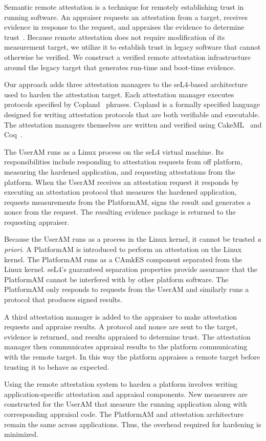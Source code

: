 Semantic remote attestation is a technique for remotely establishing
trust in running software.  An appraiser requests an attestation from
a target, receives evidence in response to the request, and appraises
the evidence to determine
trust~\cite{Haldar:04:Semantic-Remote,Coker::Principles-of-R}. Because
remote attestation does not require modification of its measurement
target, we utilize it to establish trust in legacy software
that cannot otherwise be verified.  We construct a verified remote
attestation infrastructure around the legacy target that generates
run-time and boot-time evidence.

Our approach adds three attestation managers to the seL4-based
architecture used to harden the attestation target.  Each attestation
manager executes protocols specified by Copland~\cite{Ramsdell:2019aa}
phrases.  Copland is a formally specified language designed for
writing attestation protocols that are both verifiable and executable.
The attestation managers themselves are written and verified using
CakeML~\cite{cakeml} and Coq~\cite{Bertot:2013aa}.

The UserAM runs as a Linux process on the seL4 virtual machine.  Its
responsibilities include responding to attestation requests from off
platform, measuring the hardened application, and requesting
attestations from the platform.  When the UserAM receives an
attestation request it responds by executing an attestation protocol
that measures the hardened application, requests measurements from the
PlatformAM, signs the result and generates a nonce from the request.  The
resulting evidence package is returned to the requesting appraiser.

Because the UserAM runs as a process in the Linux kernel, it cannot be
trusted \emph{a priori}.  A PlatformAM is introduced to perform an
attestation on the Linux kernel.  The PlatformAM runs as a
CAmkES component separated from the Linux kernel.  seL4's guaranteed
separation properties provide assurance that the PlatformAM cannot be
interfered with by other platform software.  The PlatformAM only
responds to requests from the UserAM and similarly runs a protocol
that produces signed results.

A third attestation manager is added to the appraiser to make
attestation requests and appraise results.  A protocol and nonce are
sent to the target, evidence is returned, and results appraised to
determine trust.  The attestation manager then communicates appraisal
results to the platform communicating with the remote target.  In this
way the platform appraises a remote target before trusting it to
behave as expected.

Using the remote attestation system to harden a platform involves
writing application-specific attestation and appraisal components.
New measurers are constructed for the UserAM that measure the running
application along with corresponding appraisal code.  The PlatformAM
and attestation architecture remain the same across applications.
Thus, the overhead required for hardening is minimized.